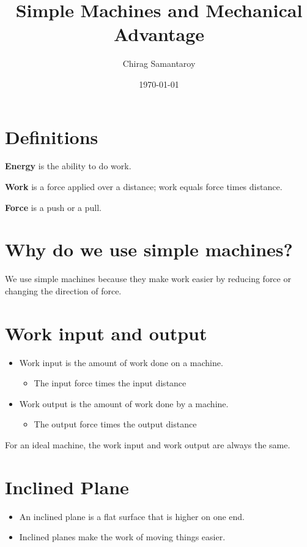\documentclass{article}
\title{Simple Machines and Mechanical Advantage}
\author{Chirag Samantaroy}
\date{\today}
\begin{document}
\maketitle

\section{Definitions}
\begin{defi}[Energy]
\textbf{Energy} is the ability to do work. 
\end{defi}
\begin{defi}[Work]
\textbf{Work} is a force applied over a distance; work equals force times distance.
\end{defi}
\begin{defi}[Force]
\textbf{Force} is a push or a pull.
\end{defi}
\section{Why do we use simple machines?}
We use simple machines because they make work easier by reducing force or changing the direction of force.
\section{Work input and output}
\begin{itemize}
    \item Work input is the amount of work done on a machine.
    \begin{itemize}
        \item The input force times the input distance
    \end{itemize}
    \item Work output is the amount of work done by a machine.
    \begin{itemize}
        \item The output force times the output distance
    \end{itemize}
\end{itemize}
For an ideal machine, the work input and work output are always the same.
\section{Inclined Plane}
\begin{itemize}
    \item An inclined plane is a flat surface that is higher on one end.
    \item Inclined planes make the work of moving things easier.
\end{itemize}
\end{document}
